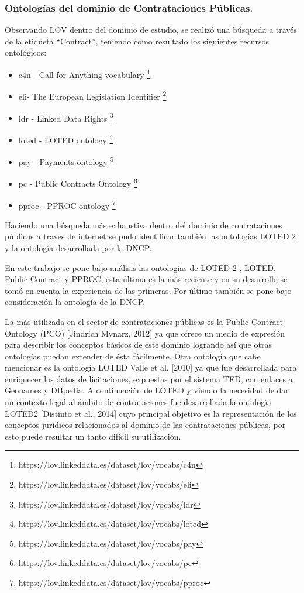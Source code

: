 \subsubsection{Ontologías del dominio de Contrataciones Públicas.}

Observando LOV dentro del dominio de estudio, se realizó una búsqueda a través de la etiqueta “Contract”, teniendo como resultado los siguientes recursos ontológicos:

\begin{itemize}
    \item c4n - Call for Anything vocabulary \footnote{https://lov.linkeddata.es/dataset/lov/vocabs/c4n}
    \item eli- The European Legislation Identifier \footnote{https://lov.linkeddata.es/dataset/lov/vocabs/eli}
    \item ldr - Linked Data Rights \footnote{https://lov.linkeddata.es/dataset/lov/vocabs/ldr}
    \item loted - LOTED ontology \footnote{https://lov.linkeddata.es/dataset/lov/vocabs/loted}
    \item pay - Payments ontology \footnote{https://lov.linkeddata.es/dataset/lov/vocabs/pay}
    \item  pc - Public Contracts Ontology \footnote{https://lov.linkeddata.es/dataset/lov/vocabs/pc}
    \item pproc - PPROC ontology \footnote{https://lov.linkeddata.es/dataset/lov/vocabs/pproc} 
\end{itemize}


Haciendo una búsqueda más exhaustiva dentro del dominio de contrataciones públicas a través de internet se pudo identificar también las ontologías LOTED 2 y la ontología desarrollada por la DNCP.

En este trabajo se pone bajo análisis las ontologías de LOTED 2 , LOTED, Public Contract y PPROC, esta última es la más reciente y en su desarrollo se tomó en cuenta la experiencia de las primeras. Por último también se pone bajo consideración la ontología de la DNCP.

La más utilizada en el sector de contrataciones públicas es la Public Contract Ontology (PCO) [Jindrich Mynarz, 2012] ya que ofrece un medio de expresión para describir los conceptos básicos de este dominio logrando así que otras ontologías puedan extender de ésta fácilmente. Otra ontología que cabe mencionar es la ontología LOTED Valle et al. [2010] ya que fue desarrollada para enriquecer los datos de licitaciones, expuestas por el sistema TED, con enlaces a Geonames y DBpedia. A continuación de LOTED y viendo la necesidad de dar un contexto legal al ámbito de contrataciones fue desarrollada la ontología LOTED2 [Distinto et al., 2014] cuyo principal objetivo es la representación de los conceptos jurídicos relacionados al dominio de las contrataciones públicas, por esto puede resultar un tanto difícil su utilización.

